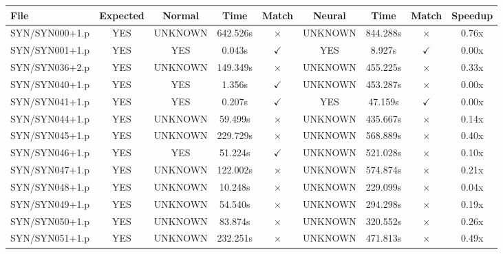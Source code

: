 \documentclass[a4paper,10pt]{article}
\begin{document}
\begin{longtable}{lcccccccc}
\toprule
\textbf{File} & \textbf{Expected} & \textbf{Normal} & \textbf{Time} & \textbf{Match} & \textbf{Neural} & \textbf{Time} & \textbf{Match} & \textbf{Speedup} \\
\midrule
\endhead
SYN/SYN000+1.p & YES & UNKNOWN & 642.526s & \cellcolor{mismatchcolor}$\times$ & UNKNOWN & 844.288s & \cellcolor{mismatchcolor}$\times$ & 0.76x \\
SYN/SYN001+1.p & YES & YES & 0.043s & \cellcolor{matchcolor}$\checkmark$ & YES & 8.927s & \cellcolor{matchcolor}$\checkmark$ & 0.00x \\
SYN/SYN036+2.p & YES & UNKNOWN & 149.349s & \cellcolor{mismatchcolor}$\times$ & UNKNOWN & 455.225s & \cellcolor{mismatchcolor}$\times$ & 0.33x \\
SYN/SYN040+1.p & YES & YES & 1.356s & \cellcolor{matchcolor}$\checkmark$ & UNKNOWN & 453.287s & \cellcolor{mismatchcolor}$\times$ & 0.00x \\
SYN/SYN041+1.p & YES & YES & 0.207s & \cellcolor{matchcolor}$\checkmark$ & YES & 47.159s & \cellcolor{matchcolor}$\checkmark$ & 0.00x \\
SYN/SYN044+1.p & YES & UNKNOWN & 59.499s & \cellcolor{mismatchcolor}$\times$ & UNKNOWN & 435.667s & \cellcolor{mismatchcolor}$\times$ & 0.14x \\
SYN/SYN045+1.p & YES & UNKNOWN & 229.729s & \cellcolor{mismatchcolor}$\times$ & UNKNOWN & 568.889s & \cellcolor{mismatchcolor}$\times$ & 0.40x \\
SYN/SYN046+1.p & YES & YES & 51.224s & \cellcolor{matchcolor}$\checkmark$ & UNKNOWN & 521.028s & \cellcolor{mismatchcolor}$\times$ & 0.10x \\
SYN/SYN047+1.p & YES & UNKNOWN & 122.002s & \cellcolor{mismatchcolor}$\times$ & UNKNOWN & 574.874s & \cellcolor{mismatchcolor}$\times$ & 0.21x \\
SYN/SYN048+1.p & YES & UNKNOWN & 10.248s & \cellcolor{mismatchcolor}$\times$ & UNKNOWN & 229.099s & \cellcolor{mismatchcolor}$\times$ & 0.04x \\
SYN/SYN049+1.p & YES & UNKNOWN & 54.540s & \cellcolor{mismatchcolor}$\times$ & UNKNOWN & 294.298s & \cellcolor{mismatchcolor}$\times$ & 0.19x \\
SYN/SYN050+1.p & YES & UNKNOWN & 83.874s & \cellcolor{mismatchcolor}$\times$ & UNKNOWN & 320.552s & \cellcolor{mismatchcolor}$\times$ & 0.26x \\
SYN/SYN051+1.p & YES & UNKNOWN & 232.251s & \cellcolor{mismatchcolor}$\times$ & UNKNOWN & 471.813s & \cellcolor{mismatchcolor}$\times$ & 0.49x \\

\end{longtable}
\end{document}
